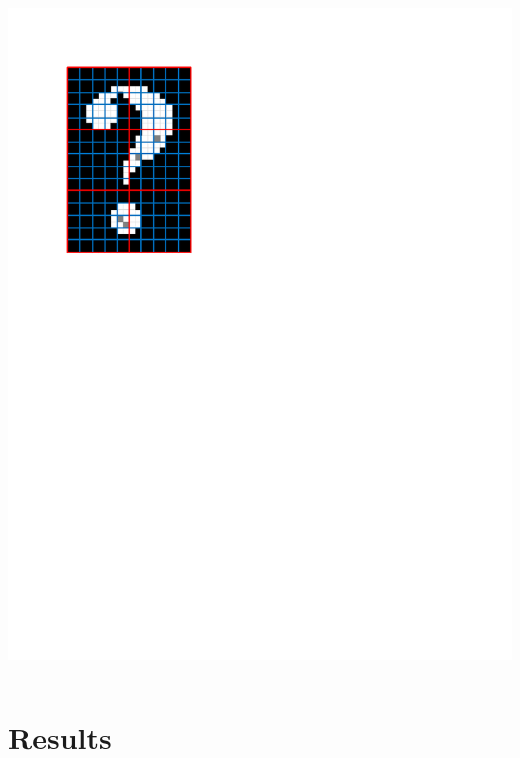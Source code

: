 \documentclass{beamer}
\begin{document}
\begin{frame}
\begin{columns}
\begin{column}{0.5\textwidth}
\begin{center}
\includegraphics[width=1\textwidth,trim={0 6.5in 4in 1in},clip]{replace_defect_2}
\end{center}
\end{column}
\end{columns}
\end{frame}

\section[Results]{Results}
\end{document}
